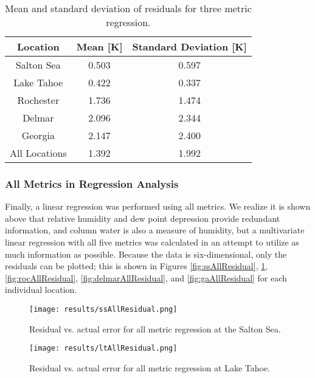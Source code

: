 \documentclass{book}
\begin{document}
\begin{table}[H]
\begin{center}
\begin{tabular}{| c | c | c |}
\hline
Location & Mean [K] & Standard Deviation [K] \\ \hline
Salton Sea & 0.503 & 0.597 \\ \hline
Lake Tahoe & 0.422 & 0.337 \\ \hline
Rochester & 1.736 & 1.474 \\ \hline
Delmar & 2.096 & 2.344 \\ \hline
Georgia & 2.147 & 2.400 \\ \hline
All Locations & 1.392 & 1.992 \\ \hline
\end{tabular}
\caption{Mean and standard deviation of residuals for three metric regression.}
\label{tab:ThreeResidual}
\end{center}
\end{table}

\subsubsection{All Metrics in Regression Analysis}

Finally, a linear regression was performed using all metrics.  We realize it is shown above that relative humidity and dew point depression provide redundant information, and column water is also a measure of humidity, but a multivariate linear regression with all five metrics was calculated in an attempt to utilize as much information as possible.  Because the data is six-dimensional, only the residuals can be plotted; this is shown in Figures \ref{fig:ssAllResidual}, \ref{fig:ltAllResidual}, \ref{fig:rocAllResidual}, \ref{fig:delmarAllResidual}, and \ref{fig:gaAllResidual} for each individual location.

\begin{figure}[H]
\begin{minipage}[b]{0.47\textwidth}
\centering
\texttt{[image: results/ssAllResidual.png]}
\caption{Residual vs. actual error for all metric regression at the Salton Sea.}
\label{fig:ssAllResidual}
\end{minipage}
\begin{minipage}[b]{0.47\textwidth}
\centering
\texttt{[image: results/ltAllResidual.png]}
\caption{Residual vs. actual error for all metric regression at Lake Tahoe.}
\label{fig:ltAllResidual}
\end{minipage}
\end{figure}
\end{document}
